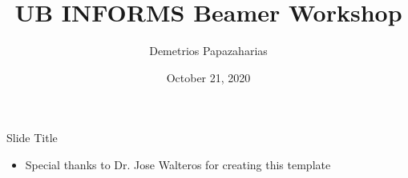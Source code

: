 \documentclass[smaller, 9pt]{beamer}
\title[Beamer Workshop]{UB INFORMS Beamer Workshop}
\author[Papazaharias, D.]{Demetrios Papazaharias\inst{1}}
\institute[UB]{\inst{1}University at Buffalo}
\date{October 21, 2020}
\begin{document}
\begin{frame}[plain]
    \maketitle
\end{frame}

\begin{frame}{Slide Title}
	\begin{itemize}
		\item Special thanks to Dr. Jose Walteros for creating this template
	\end{itemize}
\end{frame}
\end{document}

